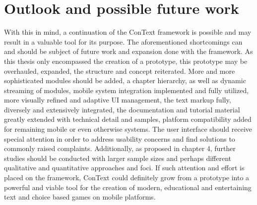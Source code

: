 \section{Outlook and possible future work}
With this in mind, a continuation of the ConText framework is possible and may result in a valuable tool for its purpose. 
The aforementioned shortcomings can and should be subject of future work and expansion done with the framework. As this thesis only encompassed the creation of a prototype, this prototype may be overhauled, expanded, the structure and concept reiterated. More and more sophisticated modules should be added, a chapter hierarchy, as well as dynamic streaming of modules, mobile system integration implemented and fully utilized, more visually refined and adaptive UI management, the text markup fully, diversely and extensively integrated, the documentation and tutorial material greatly extended with technical detail and samples, platform compatibility added for remaining mobile or even otherwise systems. 
The user interface should receive special attention in order to address usability concerns and find solutions to commonly raised complaints.
Additionally, as proposed in chapter 4, further studies should be conducted with larger sample sizes and perhaps different qualitative and quantitative approaches and foci.
If such attention and effort is placed on the framework, ConText could definitely grow from a prototype into a powerful and viable tool for the creation of modern, educational and entertaining text and choice based games on mobile platforms.